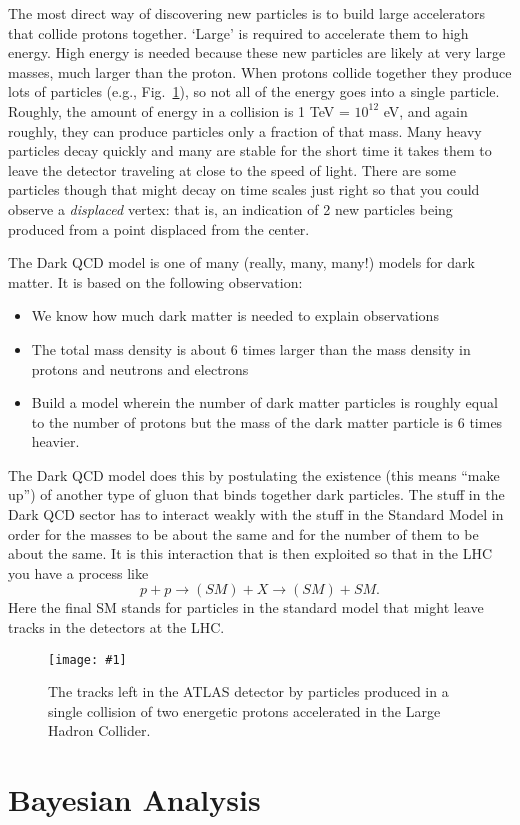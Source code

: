\documentclass[prd,amsmath,aps,floats,amssymb, floatfix,
  superscriptaddress,nofootinbib]{revtex4-1}
\newcommand{\sfig}[2]{
\texttt{[image: \#1]}
        }
\newcommand{\Sfig}[2]{
    \begin{figure}[thbp]
    \sfig{Figures/#1.pdf}{.7\columnwidth}
    \caption{{\small #2}}
    \label{fig:#1}
    \end{figure}
}
\newcommand{\rf}[1]{\ref{fig:#1}}
\numberwithin{equation}{section}
\newcommand\be{\begin{equation}}
\newcommand\ee{\end{equation}}
\newcommand\bei{\begin{itemize}}
\newcommand\eei{\end{itemize}}
\begin{document}
The most direct way of discovering new particles is to build large accelerators that collide protons together. `Large' is required to accelerate them to high energy. High energy is needed because these new particles are likely at very large masses, much larger than the proton. When protons collide together they produce lots of particles (e.g., Fig.~\rf{lhcevent}), so not all of the energy goes into a single particle. Roughly, the amount of energy in a collision is 1 TeV = $10^{12}$ eV, and again roughly, they can produce particles only a fraction of that mass. Many heavy particles decay quickly and many are stable for the short time it takes them to leave the detector traveling at close to the speed of light. There are some particles though that might decay on time scales just right so that you could observe a {\it displaced} vertex: that is, an indication of 2 new particles being produced from a point displaced from the center.

The Dark QCD model is one of many (really, many, many!) models for dark matter. It is based on the following observation:
\bei
\item We know how much dark matter is needed to explain observations
\item The total mass density is about 6 times larger than the mass density in protons and neutrons and electrons
\item Build a model wherein the number of dark matter particles is roughly equal to the number of protons but the mass of the dark matter particle is 6 times heavier.
\eei
The Dark QCD model does this by postulating the existence (this means ``make up'') of another type of gluon that binds together dark particles. The stuff in the Dark QCD sector has to interact weakly with the stuff in the Standard Model in order for the masses to be about the same and for the number of them to be about the same. It is this interaction that is then exploited so that in the LHC you have a process like
\be
p + p \rightarrow (SM) + X  \rightarrow (SM) + SM
.\ee
Here the final SM stands for particles in the standard model that might leave tracks in the detectors at the LHC.


\Sfig{lhcevent}{The tracks left in the ATLAS detector by particles produced in a single collision of two energetic protons accelerated in the Large Hadron Collider.}


\section{Bayesian Analysis}
\end{document}
